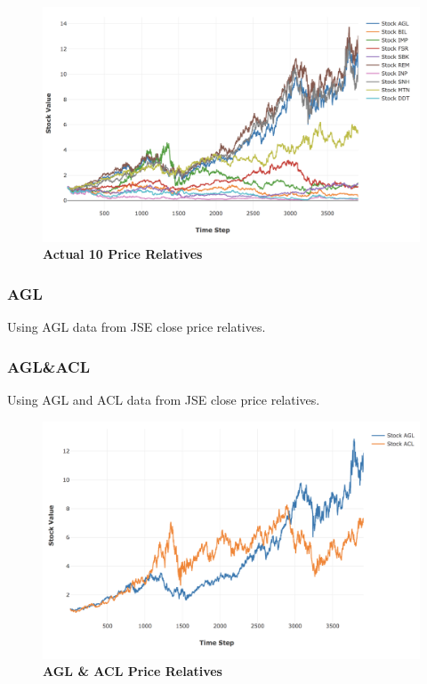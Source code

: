 \documentclass[a4paper,11pt,oneside]{article}
\theoremstyle{plain}
\theoremstyle{definition}
\begin{document}
\begin{figure}[H]
	\centering
	\includegraphics[scale=0.45]{images/results/prices/actual10_prices.png} 
	\caption[Actual 10 Prices]{\textbf{Actual 10 Price Relatives}}
	\label{figure-actual10_prices}
\end{figure}

\subsubsection{AGL}\label{dataset_agl}

Using AGL data from JSE close price relatives.

\subsubsection{AGL\&ACL}\label{dataset_aglacl}

Using AGL and ACL data from JSE close price relatives.

\begin{figure}[H]
	\centering
	\includegraphics[scale=0.45]{images/results/prices/aglacl_prices.png} 
	\caption[AGL \& ACL Prices]{\textbf{AGL \& ACL Price Relatives}}
	\label{figure-aglacl_prices}
\end{figure}
\end{document}
